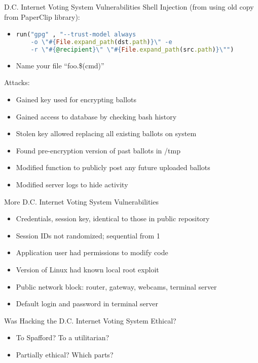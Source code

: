 \documentclass{beamer}
\begin{document}
\begin{frame}[fragile]{D.C. Internet Voting System Vulnerabilities}
Shell Injection (from using old copy from PaperClip library):
\begin{itemize}
\item[]
\begin{lstlisting}[language=Ruby]
run("gpg" , "--trust-model always
    -o \"#{File.expand_path(dst.path)}\" -e
    -r \"#{@recipient}\" \"#{File.expand_path(src.path)}\"")
\end{lstlisting}
\pause
\item[] Name your file ``foo.\$(cmd)''
\end{itemize}
\bigskip
\pause
Attacks:
\begin{itemize}
\item Gained key used for encrypting ballots
\item Gained access to database by checking bash history
\item Stolen key allowed replacing all existing ballots on system
\item Found pre-encryption version of past ballots in /tmp
\item Modified function to publicly post any future uploaded ballots
\item Modified server logs to hide activity
\end{itemize}
\end{frame}

\begin{frame}{More D.C. Internet Voting System Vulnerabilities}
\begin{itemize}
\item Credentials, session key, identical to those in public repository
\item Session IDs not randomized; sequential from 1
\item Application user had permissions to modify code
\item Version of Linux had known local root exploit
\item Public network block: router, gateway, webcams, terminal server
\item Default login and password in terminal server
\end{itemize}
\end{frame}

\begin{frame}{Was Hacking the D.C. Internet Voting System Ethical?}
\begin{itemize}
\item To Spafford? To a utilitarian?
\bigskip
\item Partially ethical? Which parts?
\end{itemize}
\end{frame}
\end{document}

